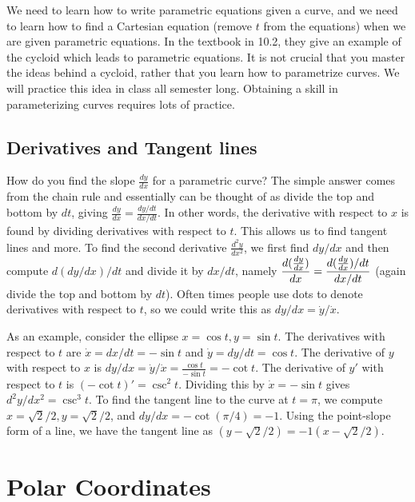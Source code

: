 We need to learn how to write parametric equations given a curve, and we need to learn how to find a Cartesian equation (remove $t$ from the equations) when we are given parametric equations.  In the textbook in 10.2, they give an example of the cycloid which leads to parametric equations. It is not crucial that you master the ideas behind a cycloid, rather that you learn how to parametrize curves. We will practice this idea in class all semester long. Obtaining a skill in parameterizing curves requires lots of practice. 

\subsection{Derivatives and Tangent lines}
How do you find the slope $\frac{dy}{dx}$ for a parametric curve?  The simple answer comes from the chain rule and essentially can be thought of as divide the top and bottom by $dt$, giving $\frac{dy}{dx} = \frac{dy/dt}{dx/dt}$. In other words, the derivative with respect to $x$ is found by dividing derivatives with respect to $t$.  This allows us to find tangent lines and more.  To find the second derivative $\frac{d^2y}{dx^2}$, we first find $dy/dx$ and then compute $d(dy/dx)/dt$ and divide it by $dx/dt$, namely 
$\displaystyle \frac{d(\frac{dy}{dx})}{dx} = \frac{d(\frac{dy}{dx})/dt}{dx/dt}$ 
(again divide the top and bottom by $dt$). Often times people use dots to denote derivatives with respect to $t$, so we could write this as $dy/dx=\dot y/\dot x$.

As an example, consider the ellipse $x=\cos t, y=\sin t$. The derivatives with respect to $t$ are $\dot x = dx/dt = -\sin t$ and $\dot y= dy/dt=\cos t$. The derivative of $y$ with respect to $x$ is $dy/dx = \dot y/\dot x = \frac{\cos t}{-\sin t} = -\cot t$.  The derivative of $y'$ with respect to $t$ is $(-\cot t)' = \csc^2 t$. Dividing this by $\dot x = -\sin t$ gives $d^2y/dx^2 = \csc^3t$.  To find the tangent line to the curve at $t=\pi$, we compute  $x=\sqrt 2/2, y=\sqrt 2/2$, and $dy/dx = -\cot (\pi/4) = -1$. Using the point-slope form of a line, we have the tangent line as $(y-\sqrt 2/2) = -1 (x-\sqrt 2 /2)$.



\section{Polar Coordinates}

